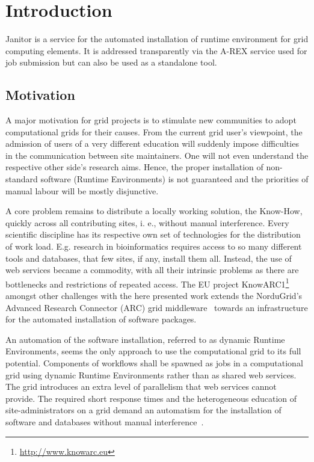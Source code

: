 \chapter{Introduction}

Janitor is a service for the automated installation of runtime environment for grid computing elements.
It is addressed transparently via the A-REX service used for job submission but can also be used as a standalone tool.

\section{Motivation}

A major motivation for grid projects is to stimulate new communities to adopt computational grids for their
causes. From the current grid user's viewpoint, the admission of users of a very different education will
suddenly impose difficulties in the communication between site maintainers. One will not even understand
the respective other side's research aims. Hence, the proper installation of non-standard software (Runtime
Environments) is not guaranteed and the priorities of manual labour will be mostly disjunctive.

A core problem remains to distribute a locally working solution, the Know-How, quickly across all
contributing sites, i. e., without manual interference. Every scientific discipline has its respective own set of
technologies for the distribution of work load. E.g. research in bioinformatics requires access to so many
different tools and databases, that few sites, if any, install them all. Instead, the use of web services became
a commodity, with all their intrinsic problems as there are bottlenecks and restrictions of repeated access.
The EU project KnowARC1\footnote{\href{http://www.knowarc.eu}{http://www.knowarc.eu}} amongst other challenges
with the here presented work extends the NorduGrid's
Advanced Research Connector (ARC) grid middleware~\cite{ELLERT_2007} towards an infrastructure for the
automated installation of software packages.

An automation of the software installation, referred to as dynamic Runtime Environments, seems the only
approach to use the computational grid to its full potential. Components of workflows shall be spawned
as jobs in a computational grid using dynamic Runtime Environments rather than as shared web services.
The grid introduces an extra level of parallelism that web services cannot provide. The required short
response times and the heterogeneous education of site-administrators on a grid demand an automatism for
the installation of software and databases without manual interference~\cite{BAYER_2007}.

